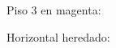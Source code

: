 \documentclass{article}
\begin{document}
Piso 3 en magenta: \par
Horizontal heredado: 
\end{document}
